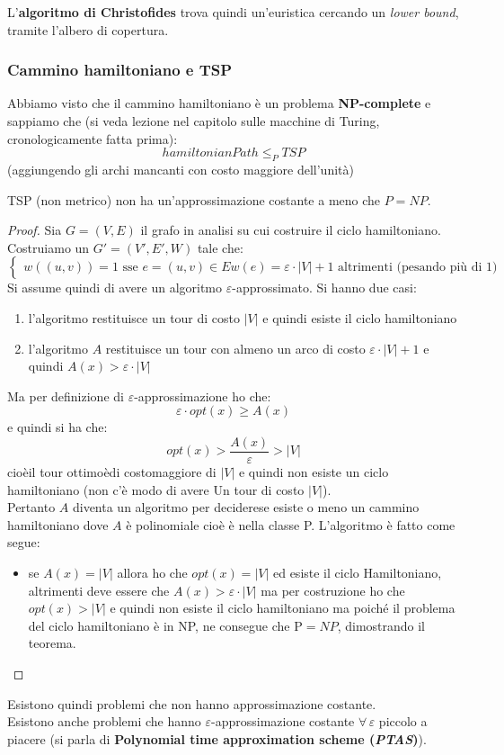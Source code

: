 L'\textbf{algoritmo di Christofides} trova quindi un'euristica cercando un
\textit{lower bound}, tramite l'albero di copertura.\\
\subsubsection{Cammino hamiltoniano e TSP}
Abbiamo visto che il cammino hamiltoniano è un problema \textbf{NP-complete} e
sappiamo che (si veda lezione nel capitolo sulle macchine di Turing,
cronologicamente fatta prima):
\[hamiltonianPath\leq_P TSP\]
(aggiungendo gli archi mancanti con costo maggiore dell'unità)
\begin{teorema}
  TSP (non metrico) non ha un'approssimazione costante a meno che $P=NP$.
\end{teorema}
\begin{proof}
  Sia $G=(V,E)$ il grafo in analisi su cui costruire il ciclo hamiltoniano.
  Costruiamo un
  $G'=(V', E', W)$ tale che:
  \[
    \begin{cases}
      w((u,v)) = 1\mbox{ sse } e=(u,v) \in E
      w(e)=\varepsilon\cdot|V|+1 \mbox{ altrimenti (pesando più di 1)}
    \end{cases}
  \]
  Si assume quindi  di avere un algoritmo $\varepsilon$-approssimato.
  Si hanno due casi:
  \begin{enumerate}
    \item l'algoritmo restituisce un tour di costo $|V|$ e quindi esiste il
    ciclo hamiltoniano
    \item l'algoritmo $A$ restituisce un tour con almeno un arco di costo
    $\varepsilon\cdot|V|+1$ e quindi $A(x)>\varepsilon\cdot |V|$
  \end{enumerate}
  Ma per definizione di $\varepsilon$-approssimazione ho che:
  \[\varepsilon\cdot opt(x)\geq A(x)\]
  e quindi si ha che:
  \[opt(x)>\frac{A(x)}{\varepsilon}>|V|\]
  cioèil tour ottimoèdi costomaggiore di $|V|$ e quindi non esiste un ciclo
  hamiltoniano (non c’è modo di avere Un tour di costo $|V|$).\\
  Pertanto $A$ diventa un algoritmo per deciderese esiste o meno un
  cammino hamiltoniano dove $A$ è polinomiale cioè è nella classe
  P. L’algoritmo è fatto come segue:
  \begin{itemize}
    \item se $A(x)=|V|$ allora ho che $opt(x)=|V|$ ed esiste il ciclo
    Hamiltoniano, altrimenti deve essere che $A(x)>\varepsilon\cdot |V|$ ma per
    costruzione ho che $opt(x)>|V|$ e quindi non esiste il ciclo hamiltoniano ma
    poiché il problema del ciclo hamiltoniano è in NP, ne consegue che P$=NP$,
    dimostrando il teorema.
  \end{itemize}
\end{proof}
Esistono quindi problemi che non hanno approssimazione costante.\\
Esistono anche problemi che hanno $\varepsilon$-approssimazione costante
$\forall\,\varepsilon$ piccolo a piacere (si parla di \textbf{Polynomial time
  approximation scheme (\textit{PTAS})}). 
